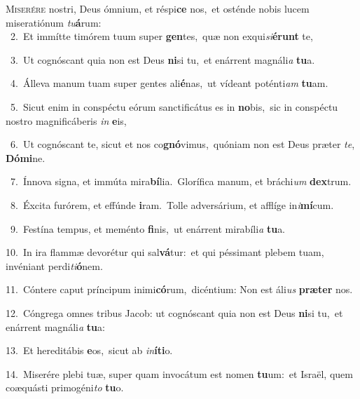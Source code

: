 \lettrine{\initial\textcolor{\initialcolor}{M}}{iserére} nostri, Deus ómnium, et réspi\textbf{ce} nos,~\star et osténde nobis lucem miseratiónum \textit{tu}\-\textbf{á}rum:\\
{\numbfont\textcolor{\numbcolor}{~2.}}~Et immítte timórem tuum super \textbf{gen}\-tes,~\star quæ non exqui\-\textit{si}\-\textbf{é}\textbf{runt} te,\par
{\numbfont\textcolor{\numbcolor}{~3.}}~Ut cognóscant quia non est Deus \textbf{ni}\-si tu,~\star et enárrent magnáli\textit{a} \textbf{tu}\-a.\par
{\numbfont\textcolor{\numbcolor}{~4.}}~Álleva manum tuam super gentes ali\-\textbf{é}\-nas,~\star ut vídeant poténti\textit{am} \textbf{tu}\-am.\par
{\numbfont\textcolor{\numbcolor}{~5.}}~Sicut enim in conspéctu eórum sanctificátus es in \textbf{no}\-bis,~\star sic in conspéctu nostro magnificáberis \textit{in} \textbf{e}\-is,\par
{\numbfont\textcolor{\numbcolor}{~6.}}~Ut cognóscant te, sicut et nos co\-\textbf{gnó}\-vimus,~\star quóniam non est Deus præter \textit{te}\-, \textbf{Dó}\-\textbf{mi}ne.\par
{\numbfont\textcolor{\numbcolor}{~7.}}~Ínnova signa, et immúta mira\-\textbf{bí}\-lia.~\star Glorífica manum, et bráchi\textit{um} \textbf{dex}\-trum.\par
{\numbfont\textcolor{\numbcolor}{~8.}}~Éxcita furórem, et effúnde \textbf{i}\-ram.~\star Tolle adversárium, et afflíge in\-\textit{i}\-\textbf{mí}cum.\par
{\numbfont\textcolor{\numbcolor}{~9.}}~Festína tempus, et meménto \textbf{fi}\-nis,~\star ut enárrent mirabíli\textit{a} \textbf{tu}\-a.\par
{\numbfont\textcolor{\numbcolor}{10.}}~In ira flammæ devorétur qui sal\-\textbf{vá}\-tur:~\star et qui péssimant plebem tuam, invéniant perdi\-\textit{ti}\-\textbf{ó}nem.\par
{\numbfont\textcolor{\numbcolor}{11.}}~Cóntere caput príncipum inimi\-\textbf{có}\-rum,~\star dicéntium: Non est áli\textit{us} \textbf{præ}\-\textbf{ter} nos.\par
{\numbfont\textcolor{\numbcolor}{12.}}~Cóngrega omnes tribus Jacob: ut cognóscant quia non est Deus \textbf{ni}\-si tu,~\star et enárrent magnáli\textit{a} \textbf{tu}\-a:\par
{\numbfont\textcolor{\numbcolor}{13.}}~Et hereditábis \textbf{e}\-os,~\star sicut ab \textit{in}\-\textbf{í}\textbf{ti}o.\par
{\numbfont\textcolor{\numbcolor}{14.}}~Miserére plebi tuæ, super quam invocátum est nomen \textbf{tu}\-um:~\star et Israël, quem coæquásti primogéni\textit{to} \textbf{tu}\-o.\par
